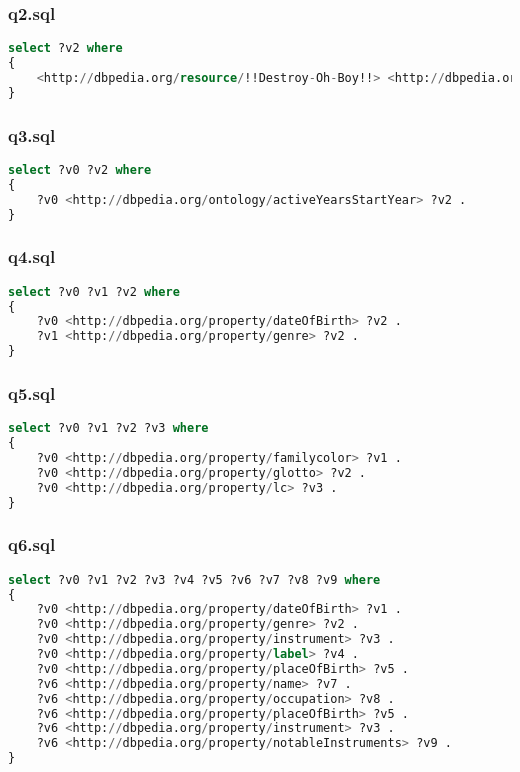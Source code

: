 \documentclass[titlepage, a4paper, 12pt] {article}
\begin{document}
\subsubsection{q2.sql}

\begin{lstlisting}[language=SQL] 
select ?v2 where
{
	<http://dbpedia.org/resource/!!Destroy-Oh-Boy!!> <http://dbpedia.org/property/title> ?v2 .
}
\end{lstlisting}

\subsubsection{q3.sql}

\begin{lstlisting}[language=SQL] 
select ?v0 ?v2 where
{
	?v0 <http://dbpedia.org/ontology/activeYearsStartYear> ?v2 .
}
\end{lstlisting}

\subsubsection{q4.sql}

\begin{lstlisting}[language=SQL] 
select ?v0 ?v1 ?v2 where
{
	?v0 <http://dbpedia.org/property/dateOfBirth> ?v2 .
	?v1 <http://dbpedia.org/property/genre> ?v2 .
}
\end{lstlisting}

\subsubsection{q5.sql}

\begin{lstlisting}[language=SQL] 
select ?v0 ?v1 ?v2 ?v3 where
{
	?v0 <http://dbpedia.org/property/familycolor> ?v1 .
	?v0 <http://dbpedia.org/property/glotto> ?v2 .
	?v0 <http://dbpedia.org/property/lc> ?v3 .
}
\end{lstlisting}

\subsubsection{q6.sql}

\begin{lstlisting}[language=SQL] 
select ?v0 ?v1 ?v2 ?v3 ?v4 ?v5 ?v6 ?v7 ?v8 ?v9 where
{
	?v0 <http://dbpedia.org/property/dateOfBirth> ?v1 .
	?v0 <http://dbpedia.org/property/genre> ?v2 .
	?v0 <http://dbpedia.org/property/instrument> ?v3 .
	?v0 <http://dbpedia.org/property/label> ?v4 .
	?v0 <http://dbpedia.org/property/placeOfBirth> ?v5 .
	?v6 <http://dbpedia.org/property/name> ?v7 .
	?v6 <http://dbpedia.org/property/occupation> ?v8 .
	?v6 <http://dbpedia.org/property/placeOfBirth> ?v5 .
	?v6 <http://dbpedia.org/property/instrument> ?v3 .
	?v6 <http://dbpedia.org/property/notableInstruments> ?v9 .
}
\end{lstlisting}
\end{document}
